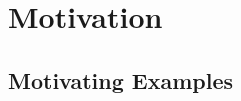 \section{Motivation}
\label{motiv:sec}

\subsection{Motivating Examples}
\label{exe:sec}























